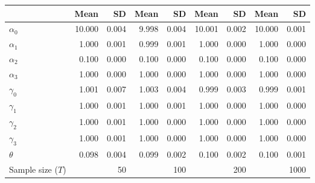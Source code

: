 
\begin{tabular}[t]{lrrrrrrrr}
\toprule
  & Mean & SD & Mean  & SD  & Mean   & SD   & Mean    & SD   \\
\midrule
$\alpha_{0}$ & 10.000 & 0.004 & 9.998 & 0.004 & 10.001 & 0.002 & 10.000 & 0.001\\
$\alpha_{1}$ & 1.000 & 0.001 & 0.999 & 0.001 & 1.000 & 0.000 & 1.000 & 0.000\\
$\alpha_{2}$ & 0.100 & 0.000 & 0.100 & 0.000 & 0.100 & 0.000 & 0.100 & 0.000\\
$\alpha_{3}$ & 1.000 & 0.000 & 1.000 & 0.000 & 1.000 & 0.000 & 1.000 & 0.000\\
$\gamma_{0}$ & 1.001 & 0.007 & 1.003 & 0.004 & 0.999 & 0.003 & 0.999 & 0.001\\
$\gamma_{1}$ & 1.000 & 0.001 & 1.000 & 0.001 & 1.000 & 0.000 & 1.000 & 0.000\\
$\gamma_{2}$ & 1.000 & 0.001 & 1.000 & 0.000 & 1.000 & 0.000 & 1.000 & 0.000\\
$\gamma_{3}$ & 1.000 & 0.001 & 1.000 & 0.000 & 1.000 & 0.000 & 1.000 & 0.000\\
$\theta$ & 0.098 & 0.004 & 0.099 & 0.002 & 0.100 & 0.002 & 0.100 & 0.001\\
Sample size ($T$) &  & 50 &  & 100 &  & 200 &  & 1000\\
\bottomrule
\end{tabular}
